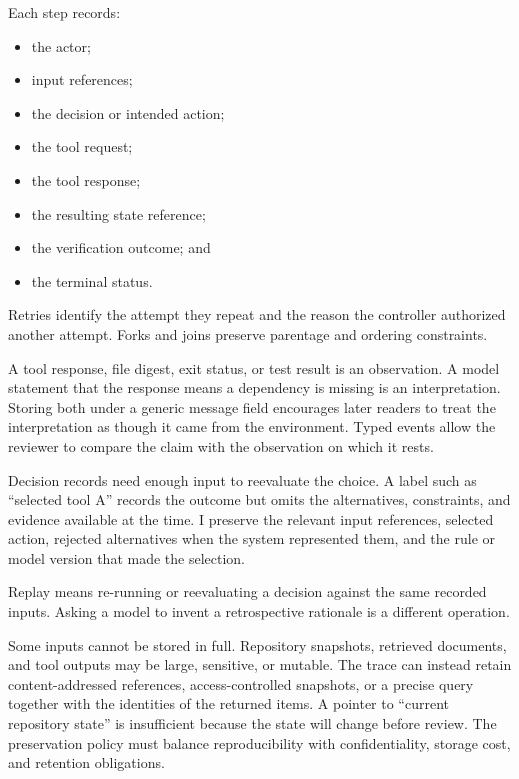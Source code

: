 
Each step records:

\begin{itemize}
\tightlist
\item
  the actor;
\item
  input references;
\item
  the decision or intended action;
\item
  the tool request;
\item
  the tool response;
\item
  the resulting state reference;
\item
  the verification outcome; and
\item
  the terminal status.
\end{itemize}

Retries identify the attempt they repeat and the reason the controller authorized another attempt. Forks and joins preserve parentage and ordering constraints.

A tool response, file digest, exit status, or test result is an observation. A model statement that the response means a dependency is missing is an interpretation. Storing both under a generic message field encourages later readers to treat the interpretation as though it came from the environment. Typed events allow the reviewer to compare the claim with the observation on which it rests.

Decision records need enough input to reevaluate the choice. A label such as ``selected tool A'' records the outcome but omits the alternatives, constraints, and evidence available at the time. I preserve the relevant input references, selected action, rejected alternatives when the system represented them, and the rule or model version that made the selection.

Replay means re-running or reevaluating a decision against the same recorded inputs. Asking a model to invent a retrospective rationale is a different operation.

Some inputs cannot be stored in full. Repository snapshots, retrieved documents, and tool outputs may be large, sensitive, or mutable. The trace can instead retain content-addressed references, access-controlled snapshots, or a precise query together with the identities of the returned items. A pointer to ``current repository state'' is insufficient because the state will change before review. The preservation policy must balance reproducibility with confidentiality, storage cost, and retention obligations.

